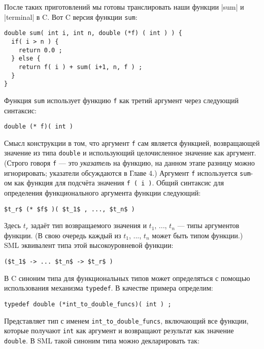 После таких приготовлений мы готовы транслировать наши функции \inline|sum| и \inline|terminal| в C. Вот C версия функции \lstinline|sum|:

\begin{lstlisting}
double sum( int i, int n, double (*f) ( int ) ) {
  if( i > n ) {
    return 0.0 ;
  } else {
    return f( i ) + sum( i+1, n, f ) ;
  }
}
\end{lstlisting}

Функция \lstinline|sum| использует функцию \lstinline|f| как третий аргумент через следующий синтаксис:

\begin{lstlisting}
double (* f)( int )
\end{lstlisting}

Смысл конструкции в том, что аргумент \lstinline|f| сам является функцией, возвращающей значение из типа \lstinline|double| и использующий целочисленное значение как аргумент. (Строго говоря \lstinline|f| --- это \emph{указатель} на функцию, на данном этапе разницу можно игнорировать; указатели обсуждаются в Главе 4.) Аргумент \lstinline|f| используется \lstinline|sum|-ом как функция для подсчёта значения \lstinline|f ( i )|. Общий синтаксис для определения функционального аргумента функции следующий:

\begin{lstlisting}
$t_r$ (* $f$ )( $t_1$ , ..., $t_n$ )
\end{lstlisting}

Здесь $t_r$ задаёт тип возвращаемого значения и $t_1$, ..., $t_n$ --- типы аргументов функции. (В свою очередь каждый из $t_1$, ..., $t_n$ может быть типом функции.) SML эквивалент типа этой высокоуровневой функции:

\begin{lstlisting}[style=customml]
($t_1$ -> ... $t_n$ -> $t_r$ )
\end{lstlisting}

В C синоним типа для функциональных типов может определяться с помощью использования механизма \lstinline|typedef|. В качестве примера определим:

\begin{lstlisting}[style=customml]
typedef double (*int_to_double_funcs)( int ) ;
\end{lstlisting}

Представляет тип с именем \lstinline|int_to_double_funcs|, включающий все функции, которые получают \lstinline|int| как аргумент и возвращают результат как значение \lstinline|double|. В SML такой синоним типа можно декларировать так:


